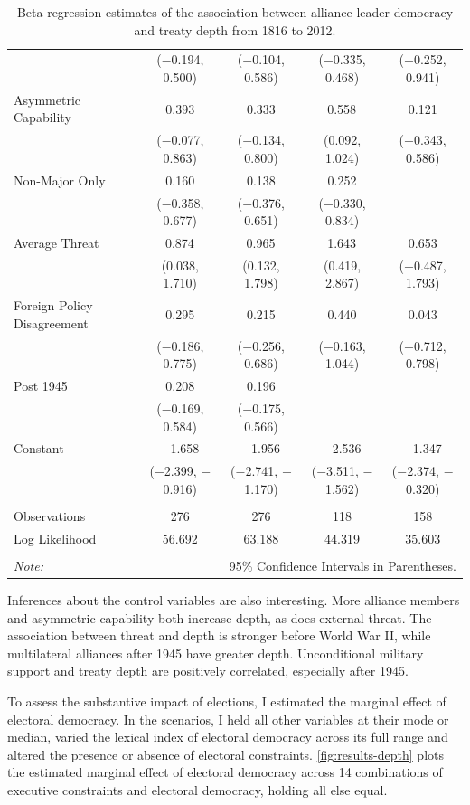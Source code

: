 \documentclass[12pt]{article}
\begin{document}
\begin{table}[!htbp]
{\begin{tabular}{@{\extracolsep{5pt}}lcccc}
  & ($-$0.194, 0.500) & ($-$0.104, 0.586) & ($-$0.335, 0.468) & ($-$0.252, 0.941) \\ 
  Asymmetric Capability & 0.393 & 0.333 & 0.558$^{}$ & 0.121 \\ 
  & ($-$0.077, 0.863) & ($-$0.134, 0.800) & (0.092, 1.024) & ($-$0.343, 0.586) \\ 
  Non-Major Only & 0.160 & 0.138 & 0.252 &  \\ 
  & ($-$0.358, 0.677) & ($-$0.376, 0.651) & ($-$0.330, 0.834) &  \\ 
  Average Threat & 0.874$^{}$ & 0.965$^{}$ & 1.643$^{}$ & 0.653 \\ 
  & (0.038, 1.710) & (0.132, 1.798) & (0.419, 2.867) & ($-$0.487, 1.793) \\ 
  Foreign Policy Disagreement & 0.295 & 0.215 & 0.440 & 0.043 \\ 
  & ($-$0.186, 0.775) & ($-$0.256, 0.686) & ($-$0.163, 1.044) & ($-$0.712, 0.798) \\ 
  Post 1945 & 0.208 & 0.196 &  &  \\ 
  & ($-$0.169, 0.584) & ($-$0.175, 0.566) &  &  \\ 
  Constant & $-$1.658$^{}$ & $-$1.956$^{}$ & $-$2.536$^{}$ & $-$1.347$^{}$ \\ 
  & ($-$2.399, $-$0.916) & ($-$2.741, $-$1.170) & ($-$3.511, $-$1.562) & ($-$2.374, $-$0.320) \\ 
 \hline \\[-1.8ex] 
Observations & 276 & 276 & 118 & 158 \\ 
Log Likelihood & 56.692 & 63.188 & 44.319 & 35.603 \\ 
\hline 
\hline \\[-1.8ex] 
\textit{Note:}  & \multicolumn{4}{r}{95\% Confidence Intervals in Parentheses.} \\ 
\end{tabular} 
}
  \caption{Beta regression estimates of the association between alliance leader democracy and treaty depth from 1816 to 2012.} 
  \label{tab:reg-est} 
\end{table} 

Inferences about the control variables are also interesting.
More alliance members and asymmetric capability both increase depth, as does external threat.
The association between threat and depth is stronger before World War II, while multilateral alliances after 1945 have greater depth. 
Unconditional military support and treaty depth are positively correlated, especially after 1945. 


To assess the substantive impact of elections, I estimated the marginal effect of electoral democracy. 
In the scenarios, I held all other variables at their mode or median, varied the lexical index of electoral democracy across its full range and altered the presence or absence of electoral constraints. 
\autoref{fig:results-depth} plots the estimated marginal effect of electoral democracy across 14 combinations of executive constraints and electoral democracy, holding all else equal. 
\end{document}
